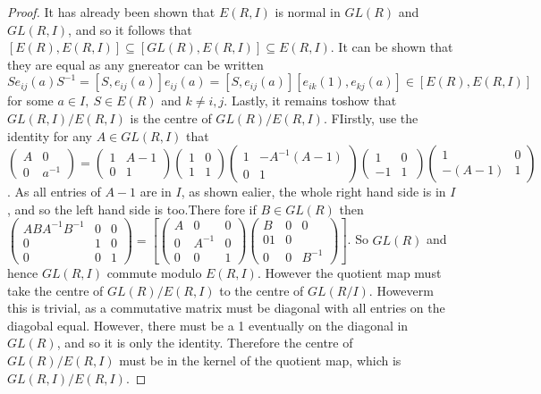 \documentclass[a4paper,10pt]{article}
\begin{document}
\begin{proof}
\newline It has already been shown that $E(R,I)$ is normal in $GL(R)$ and $GL(R,I)$, and so it follows that $[E(R),E(R,I)]\subseteq [GL(R),E(R,I)]\subseteq E(R,I)$. It can be shown that they are equal as any gnereator can be written $Se_{ij}(a)S^{-1}=[S,e_{ij}(a)]e_{ij}(a)=[S,e_{ij}(a)][e_{ik}(1),e_{kj}(a)]\in [E(R),E(R,I)]$ for some $a\in I,\ S\in E(R)$ and $k\neq i,j$.
\newline Lastly, it remains toshow that $GL(R,I)/E(R,I)$ is the centre of $GL(R)/E(R,I)$. FIirstly, use the identity for any $A\in GL(R,I)$ that $$\begin{pmatrix} A & 0 \\ 0 & a^{-1}\end{pmatrix}=\begin{pmatrix} 1 & A-1 \\ 0 & 1 \end{pmatrix}  \begin{pmatrix} 1 & 0 \\ 1 & 1\end{pmatrix} \begin{pmatrix} 1 & -A^{-1}(A-1) \\ 0 & 1 \end{pmatrix} \begin{pmatrix} 1 & 0 \\ -1 & 1\ \end{pmatrix} \begin{pmatrix} 1 & 0 \\ -(A-1) & 1 \end{pmatrix}$$. As all entries of $A-1$ are in $I$, as shown ealier, the whole right hand side is in $I$, and so the left hand side is too.There fore if $B\in GL(R)$ then $\begin{pmatrix} ABA^{-1}B^{-1} & 0 & 0 \\ 0 & 1 & 0 \\ 0 & 0 & 1 \end{pmatrix}= [\begin{pmatrix} A & 0 & 0 \\ 0 & A^{-1} & 0 \\ 0 & 0 & 1 \end{pmatrix} \begin{pmatrix} B & 0 & 0 \\ 0 1 & 0 \\ 0 & 0 & B^{-1} \end{pmatrix}]$. So $GL(R)$ and hence $GL(R,I)$  commute modulo $E(R,I)$. However the quotient map must take the centre of $GL(R)/E(R,I)$ to the centre of $GL(R/I)$. Howeverm this is trivial, as a commutative matrix must be diagonal with all entries on the diagobal equal. However, there must be a 1 eventually on the diagonal in $GL(R)$, and so it is only the identity. Therefore the centre of $GL(R)/E(R,I)$ must be in the kernel of the quotient map, which is $GL(R,I)/E(R,I)$.
\end{proof}
\end{document}
